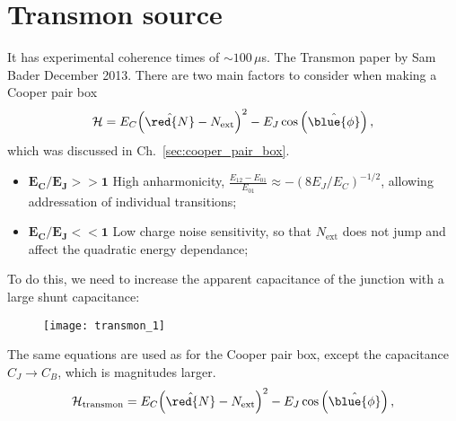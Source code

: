 \section{Transmon source\label{sec:transmon}}

It has experimental  coherence times of $ \sim 100\,\mu  $s.  The Transmon
paper  by Sam  Bader  December  2013. There  are  two  main factors  to
consider when making a Cooper pair box
\begin{equation}\label{key}
  \mathcal{H} = E_C{\left(\hat{\red{N}}-N_\text{ext}\right)^2}- E_J\cos\left(\hat{\blue{\phi}}\right),
\end{equation}
\noindent which was discussed in Ch.~\ref{sec:cooper_pair_box}.

\begin{itemize}
\item    $   \mathbf{E_C/E_J    >>    1    }$   {High    anharmonicity,
    $  \frac{E_{12} -  E_{01}}{E_{01}}\approx -(8E_J/E_C)^{-1/2}  $, allowing
    addressation of individual transitions};
\item $ \mathbf{E_C/E_J  <<1 }$ {Low charge noise  sensitivity, so that
    $  N_\text{ext} $  does not  jump and  affect the  quadratic energy
    dependance};
\end{itemize}

\noindent    {} To do this, we
need to increase the apparent capacitance  of the junction with a large
shunt capacitance:

\begin{figure}[h]
  \centering \texttt{[image: transmon\_1]}
\end{figure}

\noindent

\begin{framed}\noindent
  The same  equations are used as  for the Cooper pair  box, except the
  capacitance $ C_J \rightarrow C_B$, which is magnitudes larger.
  \begin{equation}\label{key}
    \mathcal{H}_\text{transmon} = E_C{\left(\hat{\red{N}}-N_\text{ext}\right)^2}- E_J\cos\left(\hat{\blue{\phi}}\right),
  \end{equation}

\end{framed}

\newpage
